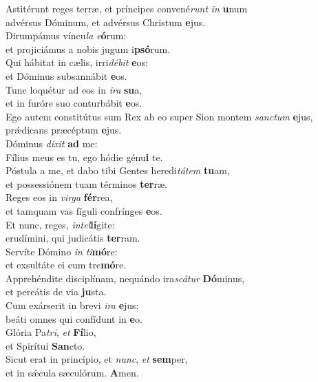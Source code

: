 \evenverse Astitérunt reges terræ, et príncipes convené\textit{runt} \textit{in} \textbf{u}num~\*\\
\evenverse advérsus Dóminum, et advérsus Christum \textbf{e}jus.\\
\oddverse Dirumpámus víncu\textit{la} \textit{e}\textbf{ó}rum:~\*\\
\oddverse et projiciámus a nobis jugum i\textbf{psó}rum.\\
\evenverse Qui hábitat in cælis, irri\textit{dé}\textit{bit} \textbf{e}os:~\*\\
\evenverse et Dóminus subsannábit \textbf{e}os.\\
\oddverse Tunc loquétur ad eos in \textit{i}\textit{ra} \textbf{su}a,~\*\\
\oddverse et in furóre suo conturbábit \textbf{e}os.\\
\evenverse Ego autem constitútus sum Rex ab eo super Sion montem \textit{san}\textit{ctum} \textbf{e}jus,~\*\\
\evenverse prǽdicans præcéptum \textbf{e}jus.\\
\oddverse Dóminus \textit{di}\textit{xit} \textbf{ad} me:~\*\\
\oddverse Fílius meus es tu, ego hódie génu\textbf{i} te.\\
\evenverse Póstula a me, et dabo tibi Gentes heredi\textit{tá}\textit{tem} \textbf{tu}am,~\*\\
\evenverse et possessiónem tuam términos \textbf{ter}ræ.\\
\oddverse Reges eos in \textit{vir}\textit{ga} \textbf{fér}rea,~\*\\
\oddverse et tamquam vas fíguli confrínges \textbf{e}os.\\
\evenverse Et nunc, reges, \textit{in}\textit{tel}\textbf{lí}gite:~\*\\
\evenverse erudímini, qui judicátis \textbf{ter}ram.\\
\oddverse Servíte Dómino \textit{in} \textit{ti}\textbf{mó}re:~\*\\
\oddverse et exsultáte ei cum tre\textbf{mó}re.\\
\evenverse Apprehéndite disciplínam, nequándo ira\textit{scá}\textit{tur} \textbf{Dó}minus,~\*\\
\evenverse et pereátis de via \textbf{ju}sta.\\
\oddverse Cum exárserit in brevi \textit{i}\textit{ra} \textbf{e}jus:~\*\\
\oddverse beáti omnes qui confídunt in \textbf{e}o.\\
\evenverse Glória Pa\textit{tri}, \textit{et} \textbf{Fí}lio,~\*\\
\evenverse et Spirítui \textbf{San}cto.\\
\oddverse Sicut erat in princípio, et \textit{nunc}, \textit{et} \textbf{sem}per,~\*\\
\oddverse et in sǽcula sæculórum. \textbf{A}men.\\
